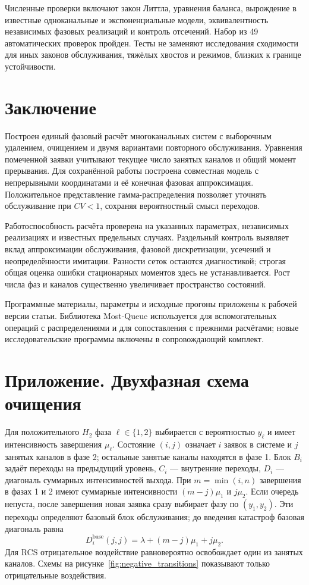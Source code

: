 \documentclass[a4paper,12pt]{article}
\begin{document}
Численные проверки включают закон Литтла, уравнения баланса, вырождение в известные одноканальные и экспоненциальные модели, эквивалентность независимых фазовых реализаций и контроль отсечений. Набор из 49 автоматических проверок пройден. Тесты не заменяют исследования сходимости для иных законов обслуживания, тяжёлых хвостов и режимов, близких к границе устойчивости.

\section{Заключение}
Построен единый фазовый расчёт многоканальных систем с выборочным удалением, очищением и двумя вариантами повторного обслуживания. Уравнения помеченной заявки учитывают текущее число занятых каналов и общий момент прерывания. Для сохранённой работы построена совместная модель с непрерывными координатами и её конечная фазовая аппроксимация. Положительное представление гамма-распределения позволяет уточнять обслуживание при \(CV<1\), сохраняя вероятностный смысл переходов.

Работоспособность расчёта проверена на указанных параметрах, независимых реализациях и известных предельных случаях. Раздельный контроль выявляет вклад аппроксимации обслуживания, фазовой дискретизации, усечений и неопределённости имитации. Разности сеток остаются диагностикой; строгая общая оценка ошибки стационарных моментов здесь не устанавливается. Рост числа фаз и каналов существенно увеличивает пространство состояний.

Программные материалы, параметры и исходные прогоны приложены к рабочей версии статьи. Библиотека Most-Queue \cite{mostqueue2026} используется для вспомогательных операций с распределениями и для сопоставления с прежними расчётами; новые исследовательские программы включены в сопровождающий комплект.

\clearpage
\section*{Приложение. Двухфазная схема очищения}
Для положительного \(H_2\) фаза \(\ell\in\{1,2\}\) выбирается с вероятностью \(y_\ell\) и имеет интенсивность завершения \(\mu_\ell\). Состояние \((i,j)\) означает \(i\) заявок в системе и \(j\) занятых каналов в фазе 2; остальные занятые каналы находятся в фазе 1. Блок \(B_i\) задаёт переходы на предыдущий уровень, \(C_i\) --- внутренние переходы, \(D_i\) --- диагональ суммарных интенсивностей выхода. При \(m=\min(i,n)\) завершения в фазах 1 и 2 имеют суммарные интенсивности \((m-j)\mu_1\) и \(j\mu_2\). Если очередь непуста, после завершения новая заявка сразу выбирает фазу по \((y_1,y_2)\). Эти переходы определяют базовый блок обслуживания; до введения катастроф базовая диагональ равна
\[
D_i^{\mathrm{base}}(j,j)=\lambda+(m-j)\mu_1+j\mu_2.
\]
Для RCS отрицательное воздействие равновероятно освобождает один из занятых каналов. Схемы на рисунке~\ref{fig:negative_transitions} показывают только отрицательные воздействия.
\end{document}
